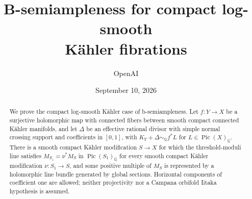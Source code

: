 \documentclass[11pt]{article}
\title{B-semiampleness for compact log-smooth\\K\"ahler fibrations}
\author{OpenAI}
\date{September 10, 2026}
\numberwithin{equation}{section}
\theoremstyle{definition}
\theoremstyle{remark}
\newcommand{\Q}{\mathbb Q}
\DeclareMathOperator{\Pic}{Pic}
\begin{document}
\maketitle
\begin{abstract}
We prove the compact log-smooth K\"ahler case of b-semiampleness. Let
$f:Y\to X$ be a surjective holomorphic map with connected fibers between
smooth compact connected K\"ahler manifolds, and let $\Delta$ be an effective
rational divisor with simple normal crossing support and coefficients in
$[0,1]$, with $K_Y+\Delta\sim_{\Q}f^*L$ for $L\in\Pic(X)_{\Q}$. There is a
smooth compact K\"ahler modification $S\to X$ for which the threshold-moduli
line satisfies $M_{S_1}=\nu^*M_S$ in $\Pic(S_1)_{\Q}$ for every smooth compact
K\"ahler modification $\nu:S_1\to S$, and some positive multiple of $M_S$ is
represented by a holomorphic line bundle generated by global sections.
Horizontal components of coefficient one are allowed; neither projectivity
nor a Campana orbifold Iitaka hypothesis is assumed.
\end{abstract}
\setcounter{tocdepth}{1}
\tableofcontents









\begingroup
\raggedright


\endgroup
\end{document}
